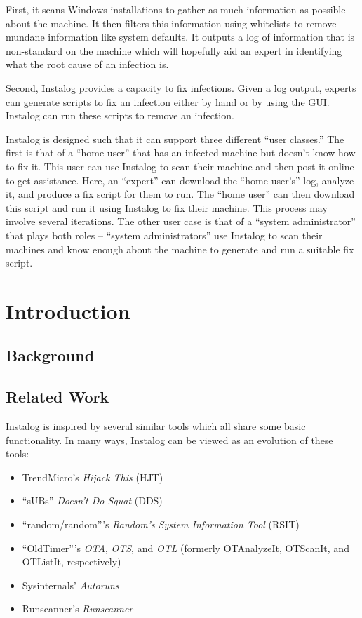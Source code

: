 \documentclass[letterpaper,12pt]{article}
\begin{document}
First, it scans Windows installations to gather as much information as possible
about the machine.  It then filters this information using whitelists to remove
mundane information like system defaults.  It outputs a log of information that
is non-standard on the machine which will hopefully aid an expert in identifying
what the root cause of an infection is.

Second, Instalog provides a capacity to fix infections.  Given a log output,
experts can generate scripts to fix an infection either by hand or by using the
GUI.  Instalog can run these scripts to remove an infection.  

Instalog is designed such that it can support three different ``user classes.'' 
The first is that of a ``home user'' that has an infected machine but doesn't
know how to fix it.  This user can use Instalog to scan their machine and then
post it online to get assistance.  Here, an ``expert'' can download the ``home
user's'' log, analyze it, and produce a fix script for them to run.  The ``home
user'' can then download this script and run it using Instalog to fix their
machine.  This process may involve several iterations.  The other user case is
that of a ``system administrator'' that plays both roles -- ``system
administrators'' use Instalog to scan their machines and know enough about the
machine to generate and run a suitable fix script.  

\newpage



\section{Introduction}
\subsection{Background}

\subsection{Related Work}
Instalog is inspired by several similar tools which all share some basic
functionality.  In many ways, Instalog can be viewed as an evolution of
these tools:

\begin{itemize}
    \item TrendMicro's {\em Hijack This} (HJT)
    \item ``sUBs'' {\em Doesn't Do Squat} (DDS)
    \item ``random/random'''s {\em Random's System Information Tool} (RSIT)
    \item ``OldTimer'''s {\em OTA}, {\em OTS}, and {\em OTL} (formerly
    OTAnalyzeIt, OTScanIt, and OTListIt, respectively)
    \item Sysinternals' {\em Autoruns}
    \item Runscanner's {\em Runscanner}
\end{itemize}
\end{document}
